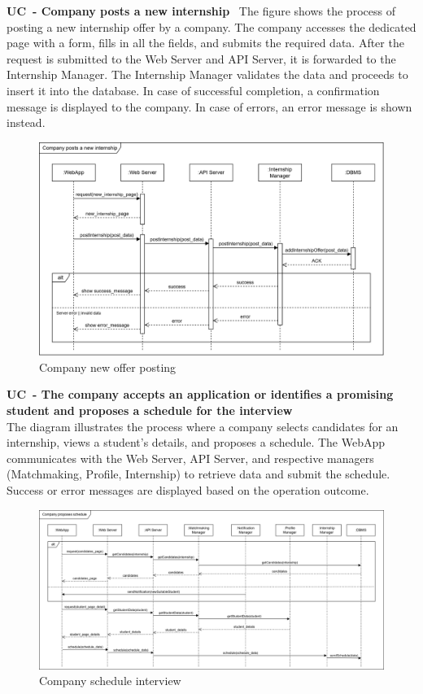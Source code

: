 \textbf{UC\cuc\ - Company posts a new internship} \ The figure shows the process of posting a new internship offer by a company. The company accesses the dedicated page with a form, fills in all the fields, and submits the required data. After the request is submitted to the Web Server and API Server, it is forwarded to the Internship Manager. The Internship Manager validates the data and proceeds to insert it into the database. In case of successful completion, a confirmation message is displayed to the company. In case of errors, an error message is shown instead.
\begin{center}
    \begin{figure}[H]
        \centering
        \includegraphics[width=1\linewidth]{Images/Sequence diagrams/UC12.png}
        \caption{Company new offer posting}
        \label{fig:enter-label}
    \end{figure}
\end{center}

\textbf{UC\cuc\  - The company accepts an application or identifies a promising student and
proposes a schedule for the interview} \\
The diagram illustrates the process where a company selects candidates for an internship, views a student's details, and proposes a schedule. The WebApp communicates with the Web Server, API Server, and respective managers (Matchmaking, Profile, Internship) to retrieve data and submit the schedule. Success or error messages are displayed based on the operation outcome.
\begin{center}
    \begin{figure}[H]
        \centering
        \includegraphics[width=1\linewidth]{Images/Sequence diagrams/UC13.png}
        \caption{Company schedule interview}
        \label{fig:enter-label}
    \end{figure}
\end{center}


